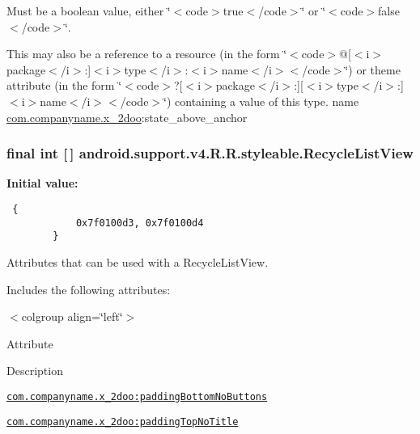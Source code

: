 Must be a boolean value, either \char`\"{}$<$code$>$true$<$/code$>$\char`\"{} or \char`\"{}$<$code$>$false$<$/code$>$\char`\"{}. 

This may also be a reference to a resource (in the form \char`\"{}$<$code$>$@\mbox{[}$<$i$>$package$<$/i$>$:\mbox{]}$<$i$>$type$<$/i$>$:$<$i$>$name$<$/i$>$$<$/code$>$\char`\"{}) or theme attribute (in the form \char`\"{}$<$code$>$?\mbox{[}$<$i$>$package$<$/i$>$:\mbox{]}\mbox{[}$<$i$>$type$<$/i$>$:\mbox{]}$<$i$>$name$<$/i$>$$<$/code$>$\char`\"{}) containing a value of this type.  name \hyperlink{namespacecom_1_1companyname_1_1x__2doo}{com.companyname.x\_\-2doo}:state\_\-above\_\-anchor \hypertarget{classandroid_1_1support_1_1v4_1_1_r_1_1styleable_01daac6761518f23e42dc126a1955191}{
\subsubsection[{RecycleListView}]{\setlength{\rightskip}{0pt plus 5cm}final int \mbox{[}$\,$\mbox{]} android.support.v4.R.R.styleable.RecycleListView}}
\label{classandroid_1_1support_1_1v4_1_1_r_1_1styleable_01daac6761518f23e42dc126a1955191}


\textbf{Initial value:}

\begin{Code}\begin{verbatim} {
            0x7f0100d3, 0x7f0100d4
        }
\end{verbatim}
\end{Code}
Attributes that can be used with a RecycleListView. 

Includes the following attributes: \begin{TabularC}{0}
\hline
\end{TabularC}
$<$colgroup align=\char`\"{}left\char`\"{}$>$ 

Attribute

Description 

{\tt \hyperlink{classandroid_1_1support_1_1v4_1_1_r_1_1styleable_c989ee173d297d6b648e6a7c3570d103}{com.companyname.x\_\-2doo:paddingBottomNoButtons}}

{\tt \hyperlink{classandroid_1_1support_1_1v4_1_1_r_1_1styleable_f5dc6d14ce6c3162b12e614839fced9b}{com.companyname.x\_\-2doo:paddingTopNoTitle}}

